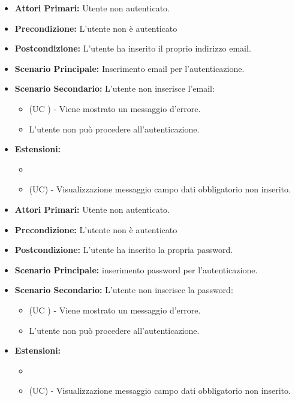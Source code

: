 \resetSubUC
{}
\begin{itemize}
	\item \textbf{Attori Primari:} Utente non autenticato.
	\item \textbf{Precondizione:} L'utente non è autenticato
	\item \textbf{Postcondizione:} L'utente ha inserito il proprio indirizzo email.
	\item \textbf{Scenario Principale:} Inserimento email per l'autenticazione.
	\item \textbf{Scenario Secondario:} L'utente non inserisce l'email:
	\begin{itemize}
		\item (UC ) - Viene mostrato un messaggio d'errore.
		\item L'utente non può procedere all'autenticazione.
	\end{itemize}
	\item \textbf{Estensioni:}
	\begin{itemize}
		\item \item (UC) - Visualizzazione messaggio campo dati obbligatorio non inserito.
	\end{itemize}
\end{itemize}

\begin{itemize}
	\item \textbf{Attori Primari:} Utente non autenticato.
	\item \textbf{Precondizione:} L'utente non è autenticato
	\item \textbf{Postcondizione:} L'utente ha inserito la propria password.
	\item \textbf{Scenario Principale:} inserimento password per l'autenticazione.
		\item \textbf{Scenario Secondario:} L'utente non inserisce la password:
	\begin{itemize}
		\item (UC ) - Viene mostrato un messaggio d'errore.
		\item L'utente non può procedere all'autenticazione.
	\end{itemize}
	\item \textbf{Estensioni:}
	\begin{itemize}
		\item \item (UC) - Visualizzazione messaggio campo dati obbligatorio non inserito.
	\end{itemize}
\end{itemize}

